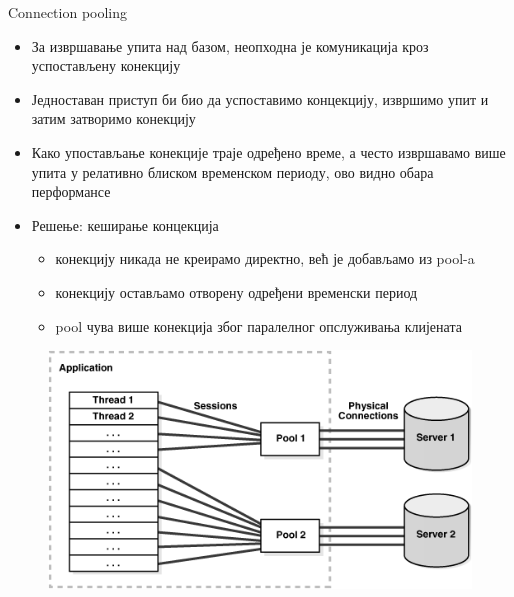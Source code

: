 \documentclass{beamer}
\begin{document}
    \begin{frame}[allowframebreaks]{Connection pooling}
        \begin{itemize}
            \item За извршавање упита над базом, неопходна је комуникација кроз успостављену конекцију
            \item Једноставан приступ би био да успоставимо концекцију, извршимо упит и затим затворимо конекцију
            \item Како упостављање конекције траје одређено време, а често извршавамо више упита у релативно блиском временском периоду, ово видно обара перформансе
            \item Решење: кеширање концекција
            \begin{itemize}
                \item конекцију никада не креирамо директно, већ је добављамо из pool-a
                \item конекцију остављамо отворену одређени временски период
                \item pool чува више конекција због паралелног опслуживања клијената
            \end{itemize} 
        \end{itemize}
        
        \framebreak
        
        \begin{figure}
            \centering
            \includegraphics[width=\textwidth,height=\textheight,keepaspectratio]{images/connpool.png}
            \label{fig:connpool}
        \end{figure}
    \end{frame}
    
\end{document}
